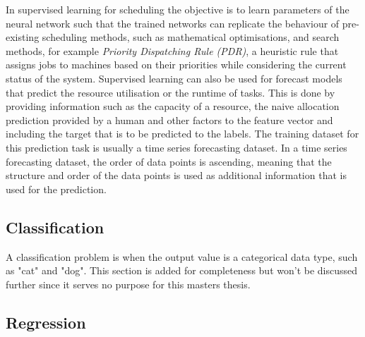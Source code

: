         In supervised learning for scheduling the objective is to learn parameters of the neural network such that the trained networks can replicate the behaviour of pre-existing scheduling methods, such as mathematical optimisations, and search methods, for example \emph{Priority Dispatching Rule (PDR)}, a heuristic rule that assigns jobs to machines based on their priorities while considering the current status of the system.
        Supervised learning can also be used for forecast models that predict the resource utilisation or the runtime of tasks.
        This is done by providing information such as the capacity of a resource, the naive allocation prediction provided by a human and other factors to the feature vector and including the target that is to be predicted to the labels. 
        The training dataset for this prediction task is usually a time series forecasting dataset.
        In a time series forecasting dataset, the order of data points is ascending, meaning that the structure and order of the data points is used as additional information that is used for the prediction.

        \subsection{Classification}
        \label{sec:classification-supervised-learning-background}

            A classification problem is when the output value is a categorical data type, such as "cat" and "dog".
            This section is added for completeness but won't be discussed further since it serves no purpose for this masters thesis.

        \subsection{Regression}
        \label{sec:regression-supervised-learning-background}

